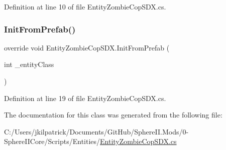 Definition at line 10 of file Entity\+Zombie\+Cop\+S\+D\+X.\+cs.

\mbox{\label{class_entity_zombie_cop_s_d_x_af297cafb54a41a88d234b6943d4a283f}} 
\subsubsection{\texorpdfstring{InitFromPrefab()}{InitFromPrefab()}}
{\footnotesize\ttfamily override void Entity\+Zombie\+Cop\+S\+D\+X.\+Init\+From\+Prefab (\begin{DoxyParamCaption}\item[{int}]{\+\_\+entity\+Class }\end{DoxyParamCaption})}



Definition at line 19 of file Entity\+Zombie\+Cop\+S\+D\+X.\+cs.



The documentation for this class was generated from the following file\+:\begin{DoxyCompactItemize}
\item 
C\+:/\+Users/jkilpatrick/\+Documents/\+Git\+Hub/\+Sphere\+I\+I.\+Mods/0-\/\+Sphere\+I\+I\+Core/\+Scripts/\+Entities/\mbox{\hyperlink{_entity_zombie_cop_s_d_x_8cs}{Entity\+Zombie\+Cop\+S\+D\+X.\+cs}}\end{DoxyCompactItemize}
